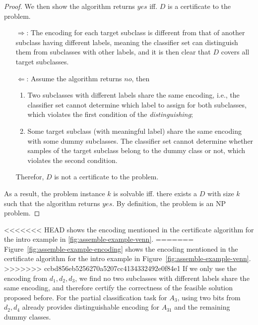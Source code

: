 \documentclass[sigplan,10pt,review]{acmart}\settopmatter{printfolios=true,printccs=false,printacmref=false}
\begin{document}
\begin{proof}
We then show the algorithm returns $yes$ iff. $D$ is a certificate to the problem.
\begin{enumerate}
	\item[$\Rightarrow$:]
	The encoding for each target subclass is different from that of another subclass having different labels, meaning the classifier set can distinguish them from subclasses with other labels, and it is then clear that $D$ covers all target subclasses.
	\item[$\Leftarrow$:]
	Assume the algorithm returns $no$, then
	\begin{enumerate}
		\item Two subclasses with different labels share the same encoding, i.e., the classifier set cannot determine which label to assign for both subclasses, which violates the first condition of the \textit{distinguishing};
		\item Some target subclass (with meaningful label) share the same encoding with some dummy subclasses.
		The classifier set cannot determine whether samples of the target subclass belong to the dummy class or not, which violates the second condition.
	\end{enumerate}
	Therefor, $D$ is not a certificate to the problem.
\end{enumerate}
As a result, the problem instance $k$ is solvable iff. there exists a $D$ with size $k$ such that the algorithm returns $yes$.
By definition, the problem is an NP problem.
\end{proof}

<<<<<<< HEAD
 shows the encoding mentioned in the certificate algorithm for the intro example in \cref{fig:assemble-example-venn}.
=======
Figure~\ref{fig:assemble-example-encoding} shows the encoding mentioned in the certificate algorithm for the intro example in Figure~\ref{fig:assemble-example-venn}.
>>>>>>> ccbd856eb5256270a5207cc4134332492e0f84e1
If we only use the encoding from $d_1, d_2, d_3$, we find no two subclasses with different labels share the same encoding, and therefore certify the correctness of the feasible solution proposed before.
For the partial classification task for $A_3$, using two bits from $d_2, d_4$ already provides distinguishable encoding for $A_{31}$ and the remaining dummy classes.
\end{document}
